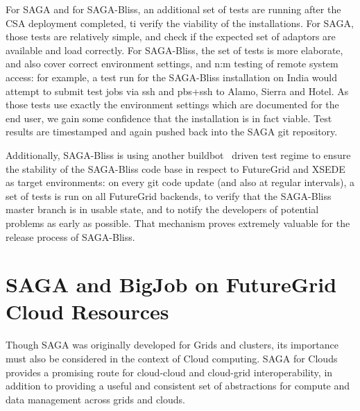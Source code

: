 \documentclass[]{paper}
\begin{document}
For SAGA and for SAGA-Bliss, an additional set of tests are running after
the CSA deployment completed, ti verify the viability of the
installations.  For SAGA, those tests are relatively simple, and check
if the expected set of adaptors are available and load correctly.  For
SAGA-Bliss, the set of tests is more elaborate, and also cover correct
environment settings, and n:m testing of remote system access: for
example, a test run for the SAGA-Bliss installation on India would attempt
to submit test jobs via ssh and pbs+ssh to Alamo, Sierra and Hotel.
As those tests use exactly the environment settings which are
documented for the end user, we gain some confidence that the
installation is in fact viable.  Test results are timestamped and
again pushed back into the SAGA git repository.

Additionally, SAGA-Bliss is using another buildbot~\cite{bliss-buildbot}
driven test regime to ensure the stability of the SAGA-Bliss code base in
respect to FutureGrid and XSEDE as target environments: on every git
code update (and also at regular intervals), a set of tests is run on
all FutureGrid backends, to verify that the SAGA-Bliss master branch is in
usable state, and to notify the developers of potential problems as
early as possible.  That mechanism proves extremely valuable for the
release process of SAGA-Bliss.


\section{SAGA and BigJob on FutureGrid Cloud Resources}

Though SAGA was originally developed for Grids and clusters, its importance must also be considered in the context of Cloud computing. SAGA for Clouds provides a promising route for cloud-cloud and cloud-grid interoperability, in addition to providing a useful and consistent set of abstractions for compute and data management across grids and clouds.
\end{document}
